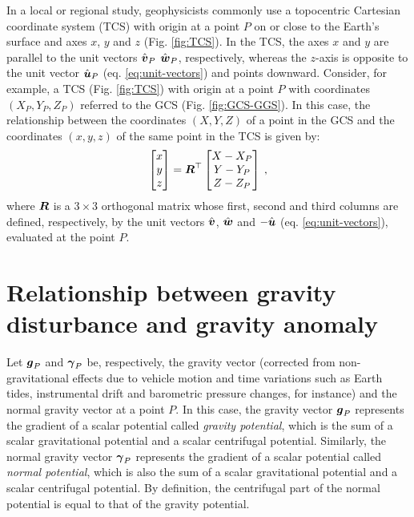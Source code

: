\documentclass[extra]{gji}
\begin{document}
In a local or regional study, geophysicists commonly use a topocentric 
Cartesian coordinate system (TCS) with origin at a point $P$ on or 
close to the Earth's surface and axes $x$, $y$ and $z$ (Fig. 
\ref{fig:TCS}). In the TCS, the axes $x$ and $y$ are parallel to 
the unit vectors $\hat{\mitbf{v}}_{P}$ $\hat{\mitbf{w}}_{P}$, respectively,
whereas the $z$-axis is opposite to the unit vector 
$\hat{\mitbf{u}}_{P}$ (eq. \ref{eq:unit-vectors}) and points downward.
Consider, for example, a TCS (Fig. \ref{fig:TCS}) with origin at a point $P$ with
coordinates $(X_{P}, Y_{P}, Z_{P})$ referred to the GCS (Fig. \ref{fig:GCS-GGS}).
In this case, the relationship between the coordinates $(X, Y, Z)$ of a 
point in the GCS and the coordinates $(x, y, z)$ of the same point in the 
TCS is given by:
\begin{equation}
\begin{bmatrix}
x \\
y \\
z 
\end{bmatrix} =
\mitbf{R}^{\top} \begin{bmatrix}
X - X_{P} \\
Y - Y_{P} \\
Z - Z_{P}
\end{bmatrix} \: ,
\label{eq:GCS2TCS}
\end{equation}
where $\mitbf{R}$ is a $3 \times 3$ orthogonal matrix whose 
first, second and third columns are defined, respectively, 
by the unit vectors $\hat{\mitbf{v}}$, $\hat{\mitbf{w}}$ 
and $-\hat{\mitbf{u}}$ (eq. \ref{eq:unit-vectors}), 
evaluated at the point $P$.


\section{Relationship between gravity disturbance and gravity anomaly}

Let $\mitbf{g}_{P}$ and $\mitbf{\gamma}_{P}$ be, respectively, the 
gravity vector (corrected from non-gravitational effects due to vehicle 
motion and time variations such as Earth tides, instrumental drift and 
barometric pressure changes, for instance) and the normal gravity vector 
at a point $P$. 
In this case, the gravity vector $\mitbf{g}_{P}$ represents the 
gradient of a scalar potential called \textit{gravity potential}, 
which is the sum of a scalar gravitational potential and a 
scalar centrifugal potential.
Similarly, the normal gravity vector $\mitbf{\gamma}_{P}$ represents the 
gradient of a scalar potential called \textit{normal potential}, 
which is also the sum of a scalar gravitational potential and a 
scalar centrifugal potential.
By definition, the centrifugal part of the normal potential is equal 
to that of the gravity potential.
\end{document}
